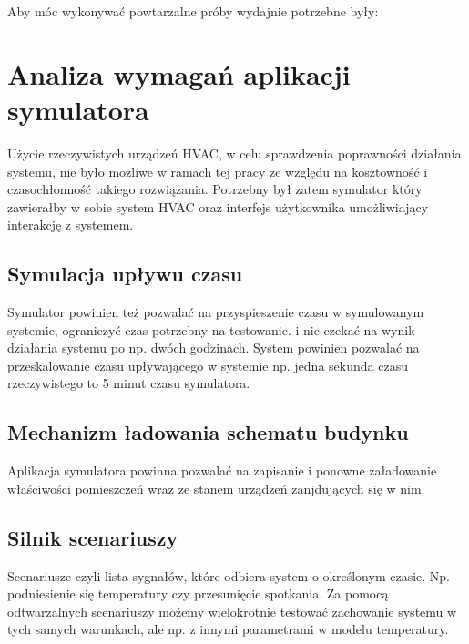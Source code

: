 Aby móc wykonywać powtarzalne próby wydajnie potrzebne były:

\section{Analiza wymagań aplikacji symulatora}
Użycie rzeczywistych urządzeń HVAC, w celu sprawdzenia poprawności działania systemu, nie było możliwe w ramach tej pracy ze względu na kosztowność i czasochłonność takiego rozwiązania. 
Potrzebny był zatem symulator który zawierałby w sobie system HVAC oraz interfejs użytkownika umożliwiający interakcję z systemem. 

\subsection*{Symulacja upływu czasu}
Symulator powinien też pozwalać na przyspieszenie czasu w symulowanym systemie, ograniczyć czas potrzebny na testowanie.
i nie czekać na wynik działania systemu po np. dwóch godzinach. System powinien pozwalać na przeskalowanie czasu upływającego w systemie np. jedna sekunda czasu rzeczywistego to 5 minut czasu symulatora.

\subsection*{Mechanizm ładowania schematu budynku}
Aplikacja symulatora powinna pozwalać na zapisanie i ponowne załadowanie właściwości pomieszczeń wraz ze stanem urządzeń zanjdujących się w nim.

\subsection*{Silnik scenariuszy}
Scenariusze czyli lista sygnałów, które odbiera system o określonym czasie. Np. podniesienie się temperatury czy przesunięcie spotkania. Za pomocą odtwarzalnych scenariuszy możemy wielokrotnie testować zachowanie systemu w tych samych warunkach, ale np. z innymi parametrami w modelu temperatury.
